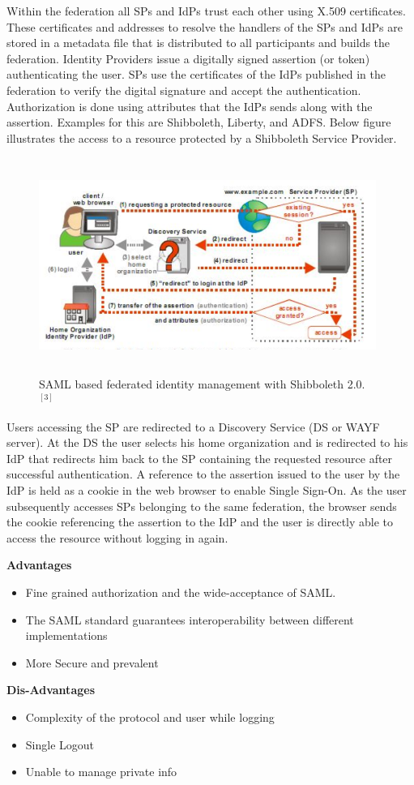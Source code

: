 \documentclass[12pt]{report}
\begin{document}
		Within the federation all SPs and IdPs trust each other using X.509 certificates. These certificates and addresses to resolve the handlers of the SPs and IdPs are stored in a metadata file that is distributed to all participants and builds the federation. Identity Providers issue a digitally signed assertion (or token) authenticating the user. SPs use the certificates of the IdPs published in the federation to verify the digital signature and accept the authentication. Authorization is done using attributes that the IdPs sends along with the assertion. Examples for this are Shibboleth, Liberty, and ADFS. Below figure illustrates the access to a resource protected by a Shibboleth Service Provider.
	\begin{figure}[H]
	\begin{center}
	\includegraphics[width=11cm,height=7cm]{./3-1.png}
	\caption{ SAML based federated identity management with Shibboleth 2.0. $ ^{[3]}$ \label{fig:SAML based federated identity management with Shibboleth2.0. }}
	\end{center}
	\end{figure}
	Users accessing the SP are redirected to a Discovery Service (DS or WAYF server). At the DS the user selects his home organization and is redirected to his IdP that redirects him back to the SP containing the requested resource after successful authentication. A reference to the assertion issued to the user by the IdP is held as a cookie in the web browser to enable Single Sign-On. As the user subsequently accesses SPs belonging to the same federation, the browser sends the cookie referencing the assertion to the IdP and the user is directly able to access the resource without logging in again.\newline
	
	\textbf{Advantages}
	\begin{itemize}
		\item Fine grained authorization and the wide-acceptance of SAML.
		\item The SAML standard guarantees interoperability between different implementations
		\item More Secure and prevalent
	\end{itemize}
	\textbf{Dis-Advantages}
	\begin{itemize}
	\item Complexity of the protocol and user while logging
	\item Single Logout
	\item Unable to manage private info
	\end{itemize}
\end{document}
